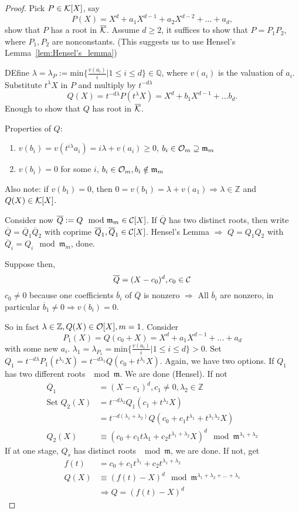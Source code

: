 \documentclass[11pt]{article}
\newcommand{\intg}{\mathbb Z}
\newcommand{\ratl}{\mathbb Q}
\newcommand{\scm}{{\mathfrak m}}
\newcommand{\calc}{{\cal C}}
\newcommand{\calk}{{\cal K}}
\newcommand{\calo}{{\cal O}}
\newcommand{\Lrta}{\Longrightarrow}
\begin{document}
\begin{proof}
Pick $P\in \calk[X]$, say 
$$
P(X)=X^d+a_1 X^{d-1}+a_2 X^{d-2}+...+a_d,
$$
show that $P$ has a root in $\overline{\calk}$. Assume $d\geq 2$, it suffices to show that $P=P_1P_2$, where $P_1, P_2$ are nonconstants. (This suggests us to use Hensel's Lemma~\ref{lem:Hensel's_lemma})

DEfine $\lambda=\lambda_P:=\text{min}\{\frac{v(a_i)}{i}|1\leq i\leq d\}\in \ratl$, where $v(a_i)$ is the valuation of $a_i$. Substitute $t^\lambda X$ in $P$ and multiply by $t^{-d\lambda}$
$$
Q(X)=t^{-d\lambda}P(t^{\lambda} X)=X^d+b_1 X^{d-1}+...b_d.
$$
Enough to show that $Q$ has root in $\overline{\calk}$.

Properties of $Q$:
\begin{enumerate}[label=(\arabic*)]
\item $v(b_i)=v(t^{i\lambda}a_i)=i\lambda+v(a_i)\geq 0$, $b_i\in \calo_m\supseteq \scm_m$
\item $v(b_i)=0$ for some $i$, $b_i\in \calo_m,b_i\notin\scm_m$
\end{enumerate}
Also note: if $v(b_1)=0$, then $0=v(b_1)=\lambda+v(a_1)\Lrta\lambda\in \intg$ and $Q(X)\in\calk[X]$.

Consider now $\overline{Q}:=Q\mod \scm_m\in\calc[X]$. If $\overline{Q}$ has two distinct roots, then write $\overline{Q}=\overline{Q}_1\overline{Q}_2$ with coprime $\overline{Q}_1,\overline{Q}_1\in\calc[X]$. Hensel's Lemma $\Lrta$ $Q=Q_1Q_2$ with $\overline{Q}_i=Q_i\mod \scm_m$, done.

Suppose then,
$$
\overline{Q}=(X-c_0)^d,c_0\in\calc
$$
$c_0\neq 0$ because one coefficients $\overline{b}_i$ of $\overline{Q}$ is nonzero $\Lrta$ All $\overline{b}_i$ are nonzero, in particular $\overline{b}_1\neq 0\Lrta v(b_i)=0$.

So in fact $\lambda\in\intg, Q(X)\in\calo[X],m=1$. Consider
$$
P_1(X)=Q(c_0+X)
=X^d+a_1 X^{d-1}+...+a_d
$$
with some new $a_i$.
$\lambda_1=\lambda_{P_1}=\text{min}\{\frac{v(a_i)}{i}|1\leq i\leq d\}>0$. Set $Q_1=t^{-d\lambda} P_1(t^{\lambda_1} X)=t^{-d\lambda_1}Q(c_0+t^{\lambda_1}X)$. Again, we have two options. If $Q_1$ has two different roots $\mod\scm$. We are done (Hensel).  If not
$$
\begin{aligned}
\overline{Q}_1&=(X-c_1)^d, c_1\neq 0,\lambda_2\in\intg\\
\text{Set }  Q_2(X)&=t^{-d\lambda_2} Q_1(c_1+t^{\lambda_2} X)\\
&= t^{-d(\lambda_1+\lambda_2)}Q(c_0+c_1t^{\lambda_1}+t^{\lambda_1\lambda_2} X)\\
Q_2(X)&\equiv (c_0+c_1 t{\lambda_1}+c_2 t^{\lambda_1+\lambda_2}X)^d
\mod \scm^{\lambda_1+\lambda_2}
\end{aligned}
$$
If at one stage, $Q_s$ has distinct roots $\mod\scm$, we are done. If not, get 
$$
\begin{aligned}
f(t)&=c_0+c_1 t^{\lambda_1}+c_2 t^{\lambda_1+\lambda_2}\\
Q(X)&\equiv (f(t)-X)^d\mod \scm^{\lambda_1+\lambda_2+...+\lambda_s}\\
&\Lrta Q=(f(t)-X)^d
\end{aligned}
$$
\end{proof}
\end{document}
